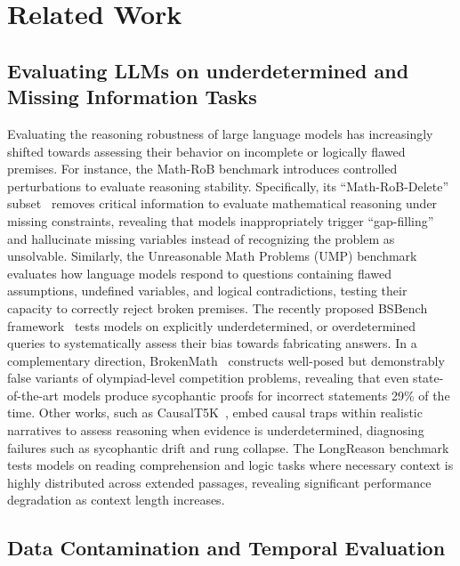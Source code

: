 \documentclass{article} %
\begin{document}
\section{Related Work}
\label{sec:related}

\subsection{Evaluating LLMs on underdetermined and Missing Information Tasks}

Evaluating the reasoning robustness of large language models has increasingly shifted towards assessing their behavior on incomplete or logically flawed premises. For instance, the Math-RoB benchmark introduces controlled perturbations to evaluate reasoning stability. Specifically, its ``Math-RoB-Delete'' subset~\cite{yu2025mathrob} removes critical information to evaluate mathematical reasoning under missing constraints, revealing that models inappropriately trigger ``gap-filling'' and hallucinate missing variables instead of recognizing the problem as unsolvable. Similarly, the Unreasonable Math Problems (UMP) benchmark~\cite{ma2024ump} evaluates how language models respond to questions containing flawed assumptions, undefined variables, and logical contradictions, testing their capacity to correctly reject broken premises. The recently proposed BSBench framework~\cite{erziev2025bsbench} tests models on explicitly underdetermined, or overdetermined queries to systematically assess their bias towards fabricating answers. In a complementary direction, BrokenMath~\cite{petrov2025brokenmath} constructs well-posed but demonstrably false variants of olympiad-level competition problems, revealing that even state-of-the-art models produce sycophantic proofs for incorrect statements 29\% of the time. Other works, such as CausalT5K~\cite{geng2026causalt5k}, embed causal traps within realistic narratives to assess reasoning when evidence is underdetermined, diagnosing failures such as sycophantic drift and rung collapse. The LongReason benchmark~\cite{ling2025longreason} tests models on reading comprehension and logic tasks where necessary context is highly distributed across extended passages, revealing significant performance degradation as context length increases.

\subsection{Data Contamination and Temporal Evaluation}
\end{document}
